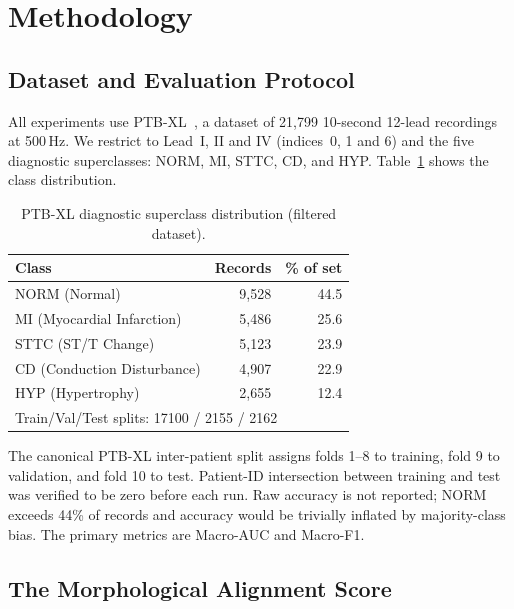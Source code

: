 \documentclass{article}
\begin{document}
\section{Methodology}

\subsection{Dataset and Evaluation Protocol}

All experiments use PTB-XL~\cite{strodthoff2021}, a dataset of
21,799 10-second 12-lead recordings at 500\,Hz. We restrict to Lead~I, II and IV
(indices~0, 1 and 6) and the five diagnostic superclasses: NORM, MI, STTC, CD,
and HYP. Table~\ref{tab:dataset} shows the class distribution.

\begin{table}[h!]
\caption{PTB-XL diagnostic superclass distribution (filtered dataset).}
\label{tab:dataset}
\vskip 0.1in
\begin{center}
\begin{small}
\begin{tabular}{lrr}
\toprule
Class & Records & \% of set \\
\midrule
NORM (Normal)               & 9,528 & 44.5 \\
MI (Myocardial Infarction)  & 5,486 & 25.6 \\
STTC (ST/T Change)          & 5,123 & 23.9 \\
CD (Conduction Disturbance) & 4,907 & 22.9 \\
HYP (Hypertrophy)           & 2,655 & 12.4 \\
\midrule
\multicolumn{3}{l}{Train/Val/Test splits: 17100 / 2155 / 2162} \\
\bottomrule
\end{tabular}
\end{small}
\end{center}
\end{table}

The canonical PTB-XL inter-patient split assigns folds 1--8 to
training, fold 9 to validation, and fold 10 to test. Patient-ID
intersection between training and test was verified to be zero before
each run. Raw accuracy is not reported; NORM exceeds 44\% of records
and accuracy would be trivially inflated by majority-class bias.
The primary metrics are Macro-AUC and Macro-F1.

\subsection{The Morphological Alignment Score}
\end{document}
